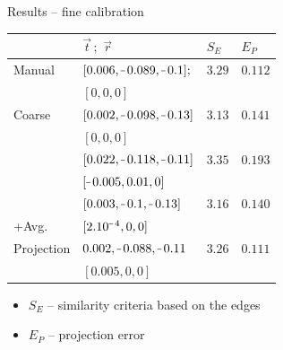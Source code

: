 \documentclass[pdf]{beamer}
\begin{document}
	\begin{frame}{Results -- fine calibration}
		\newcommand\minus{%
		  \setbox0=\hbox{-}%
		  \vcenter{%
		    \hrule width\wd0 height \the\fontdimen8\textfont3%
		  }\,%
		}
		\begin{table}[h]
			\centering
			\begin{tabular}{|l|l|l|l|}
				\hline
				 & $\vec{t}\, ;\,\, \vec{r}$ &   $S_E$ & $E_P$  \\
				\hline\hline
				
				Manual & $[0.006, \minus 0.089, \minus 0.1];$ & $3.29$ & $0.112$ \\
				& $[0,0,0]$ & & \\
				\hline
				Coarse & $[0.002, \minus 0.098, \minus 0.13]$ & $3.13$ & $0.141$ \\
				& $[0,0,0]$ & & \\
				\hline
				[Levin09] & $[0.022, \minus 0.118, \minus 0.11]$ & $3.35$ & $0.193$ \\
				& $[\minus 0.005, 0.01, 0]$ & & \\
				\hline
				[Levin09] & $[0.003, \minus 0.1, \minus 0.13]$ & $3.16$ & $0.140$ \\
				+Avg.& $[2.10^{\minus 4}, 0, 0]$ & & \\
				\hline
				Projection & $0.002, \minus 0.088, \minus 0.11$ & $3.26$ & $0.111$ \\
				& $[0.005, 0, 0]$ & & \\
				\hline
				
			\end{tabular}
		\end{table}
		
		\begin{itemize}
			\item $S_E$ -- similarity criteria based on the edges
			\item $E_P$ -- projection error
		\end{itemize}
	\end{frame}	
	
\end{document}

